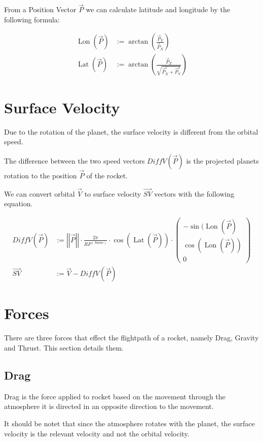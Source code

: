 \documentclass[11pt]{article}
\newcommand{\oa}[1]{\overrightarrow{#1}}
\newcommand{\Pos}{\oa{P}}
\newcommand{\Vel}{\oa{V}}
\newcommand{\absvec}[1]{\left|\left|{#1}\right|\right|}
\DeclareMathOperator{\Lat}{Lat}
\DeclareMathOperator{\Lon}{Lon}
\begin{document}
From a Position Vector $\Pos$ we can calculate latitude
and longitude by the following formula:

\begin{align}
  \Lon(\Pos) &:= \arctan\left(\frac{\Pos_Y}{\Pos_X}\right)\\
  \Lat(\Pos) &:= \arctan\left(\frac{\Pos_Z}{\sqrt{\Pos_X^2+\Pos_Y^2}}\right)
\end{align}

\section{Surface Velocity}

Due to the rotation of the planet, the surface velocity is different from
the orbital speed.

The difference between the two speed vectors $DiffV(\Pos)$ is the
projected planets rotation to the position $\Pos$ of the rocket.

We can convert orbital $\Vel$ to surface velocity $\oa{SV}$
vectors with the following equation.

\begin{align}
  DiffV(\Pos) &:= \absvec{\Pos} \cdot \frac{2 \pi}{RP^{(Name)}} \cdot \cos\left(\Lat\left(\Pos\right)\right)\cdot\left(\begin{smallmatrix}-\sin(\Lon(\Pos)\\\cos(\Lon(\Pos))\\0\end{smallmatrix}\right)\\
  \oa{SV} &:= \Vel - DiffV(\Pos)
\end{align}

\section{Forces}

There are three forces that effect the flightpath of a rocket, namely
Drag, Gravity and Thrust. This section details them.

\subsection{Drag}

Drag is the force applied to rocket based on the movement through the
atmosphere it is directed in an opposite direction to the movement.

It should be notet that since the atmosphere rotates with the planet,
the surface velocity is the relevant velocity and not the orbital
velocity.
\end{document}

